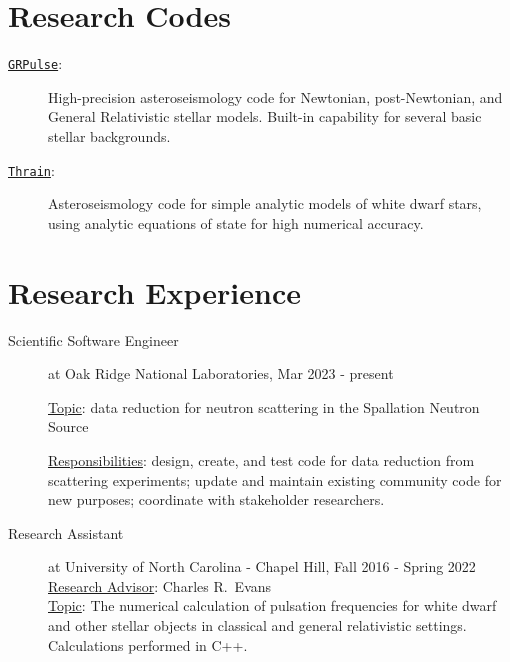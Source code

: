 \documentclass[11pt]{article}
\begin{document}
\section*{Research Codes}
\begin{description}
	\item[\href{https://github.com/rboston628/grpulse}{\tt GRPulse}:] High-precision asteroseismology code for Newtonian, post-Newtonian, and General Relativistic stellar models.  Built-in capability for several basic stellar backgrounds.
	\item[\href{https://github.com/rboston628/thrain}{\tt Thrain}:] Asteroseismology code for simple analytic models of white dwarf stars, using analytic equations of state for high numerical accuracy.
\end{description}

\section*{Research Experience}
\begin{minipage}{\textwidth}
	\begin{description}
		\item[Scientific Software Engineer] at Oak Ridge National Laboratories, Mar 2023 - present\\
		\rule{0pt}{12pt}\underline{Topic}: 
			data reduction for neutron scattering in the Spallation Neutron Source
		\\
		\rule{0pt}{12pt}\underline{Responsibilities}: 
			design, create, and test code for data reduction from scattering experiments;
			update and maintain existing community code for new purposes;
			coordinate with stakeholder researchers.	
		\item[Research Assistant] at University of North Carolina - Chapel Hill, Fall 2016 - Spring 2022\\
		\underline{Research Advisor}: Charles R.~Evans\\
		\underline{Topic}: The numerical calculation of pulsation frequencies for white dwarf and other stellar objects in classical and general relativistic settings.  Calculations performed in C++.
	\end{description}
\end{minipage}
\end{document}
